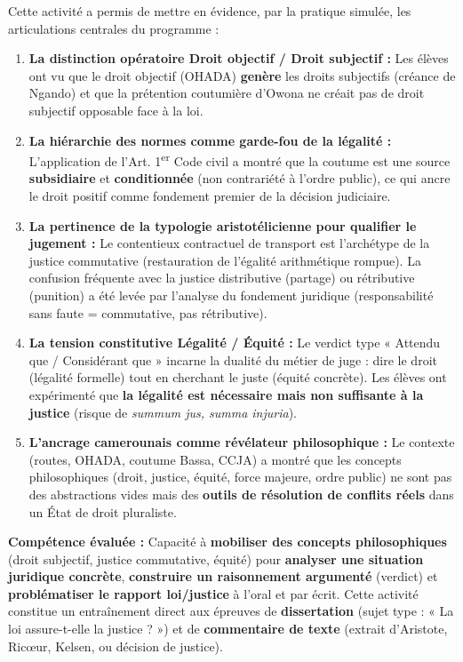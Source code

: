 \documentclass[11pt]{article}
\newcommand{\cle}[1]{{\popxbold\color{popdark}#1}}
\newcounter{popsec}
\newcounter{popsub}
\newcommand{\courssub}[1]{%
  \stepcounter{popsub}%
  \par\vspace{9pt}\noindent{\popxbold\fontsize{11.5}{13}\selectfont\color{popink}{\color{poporange}\thepopsec.\thepopsub}\hspace{6pt}#1}\par\nopagebreak\vspace{4pt}
}
\begin{document}
\courssub{Bilan de l'activité}
Cette activité a permis de mettre en évidence, par la pratique simulée, les articulations centrales du programme :
\begin{enumerate}
    \item \textbf{La distinction opératoire Droit objectif / Droit subjectif :} Les élèves ont vu que le droit objectif (OHADA) \textbf{genère} les droits subjectifs (créance de Ngando) et que la prétention coutumière d'Owona ne créait pas de droit subjectif opposable face à la loi.
    \item \textbf{La hiérarchie des normes comme garde-fou de la légalité :} L'application de l'Art. 1\textsuperscript{er} Code civil a montré que la \cle{coutume} est une source \textbf{subsidiaire} et \textbf{conditionnée} (non contrariété à l'ordre public), ce qui ancre le droit positif comme fondement premier de la décision judiciaire.
    \item \textbf{La pertinence de la typologie aristotélicienne pour qualifier le jugement :} Le contentieux contractuel de transport est l'archétype de la \cle{justice commutative} (restauration de l'égalité arithmétique rompue). La confusion fréquente avec la justice distributive (partage) ou rétributive (punition) a été levée par l'analyse du fondement juridique (responsabilité sans faute = commutative, pas rétributive).
    \item \textbf{La tension constitutive Légalité / Équité :} Le verdict type « Attendu que / Considérant que » incarne la dualité du métier de juge : dire le droit (légalité formelle) tout en cherchant le juste (équité concrète). Les élèves ont expérimenté que \textbf{la légalité est nécessaire mais non suffisante à la justice} (risque de \textit{summum jus, summa injuria}).
    \item \textbf{L'ancrage camerounais comme révélateur philosophique :} Le contexte (routes, OHADA, coutume Bassa, CCJA) a montré que les concepts philosophiques (droit, justice, équité, force majeure, ordre public) ne sont pas des abstractions vides mais des \textbf{outils de résolution de conflits réels} dans un État de droit pluraliste.
\end{enumerate}
\textbf{Compétence évaluée :} Capacité à \textbf{mobiliser des concepts philosophiques} (droit subjectif, justice commutative, équité) pour \textbf{analyser une situation juridique concrète}, \textbf{construire un raisonnement argumenté} (verdict) et \textbf{problématiser le rapport loi/justice} à l'oral et par écrit. Cette activité constitue un entraînement direct aux épreuves de \textbf{dissertation} (sujet type : « La loi assure-t-elle la justice ? ») et de \textbf{commentaire de texte} (extrait d'Aristote, Ricœur, Kelsen, ou décision de justice).
\end{document}
